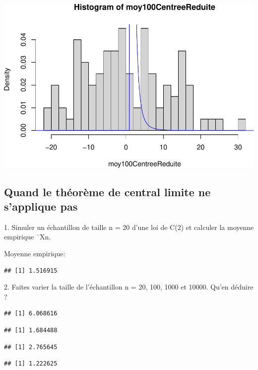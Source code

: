 \documentclass[
]{article}
\begin{document}
\includegraphics{tp2_files/figure-latex/normalisation-3.pdf}

\hypertarget{quand-le-thuxe9oruxe8me-de-central-limite-ne-sapplique-pas}{%
\subsection{Quand le théorème de central limite ne s'applique
pas}\label{quand-le-thuxe9oruxe8me-de-central-limite-ne-sapplique-pas}}

1. Simuler un échantillon de taille n = 20 d'une loi de C(2) et calculer
la moyenne empirique ¯Xn.

Moyenne empirique:

\begin{verbatim}
## [1] 1.516915
\end{verbatim}

2. Faites varier la taille de l'échantillon n = 20, 100, 1000 et 10000.
Qu'en déduire ?

\begin{verbatim}
## [1] 6.068616
\end{verbatim}

\begin{verbatim}
## [1] 1.684488
\end{verbatim}

\begin{verbatim}
## [1] 2.765645
\end{verbatim}

\begin{verbatim}
## [1] 1.222625
\end{verbatim}
\end{document}

